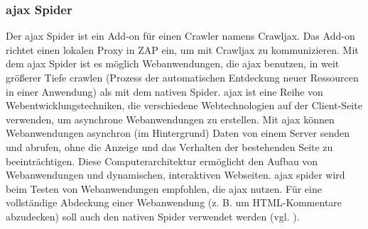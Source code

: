\subsubsection{\acs{ajax} Spider}

Der \acs{ajax} Spider ist ein Add-on für einen Crawler namens Crawljax.
Das Add-on richtet einen lokalen Proxy in ZAP ein, um mit Crawljax
zu kommunizieren. Mit dem \acs{ajax} Spider ist es möglich Webanwendungen,
die  \acs{ajax} benutzen, in weit größerer Tiefe \gls{crawlen} (Prozess der
automatischen Entdeckung neuer Ressourcen in einer Anwendung) als mit
dem nativen Spider. \acs{ajax} ist eine Reihe von Webentwicklungstechniken, die
verschiedene Webtechnologien auf der Client-Seite verwenden, um
asynchrone Webanwendungen zu erstellen. Mit \acs{ajax} können Webanwendungen
asynchron (im Hintergrund) Daten von einem Server senden und abrufen,
ohne die Anzeige und das Verhalten der bestehenden Seite zu beeinträchtigen.
Diese Computerarchitektur ermöglicht den Aufbau von Webanwendungen und
dynamischen, interaktiven Webseiten. \acs{ajax} spider wird beim Testen von Webanwendungen
empfohlen, die \acs{ajax} nutzen. Für eine vollständige Abdeckung einer
Webanwendung (z. B. um HTML-Kommentare abzudecken) soll auch den
nativen Spider verwendet werden (vgl. \cite{ajax}).

